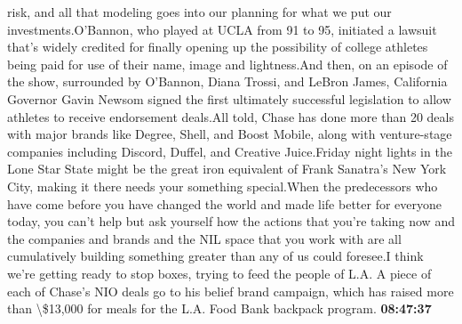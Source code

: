 \documentclass{article}%
\begin{document}
risk, and all that modeling goes into our planning for what we put our investments.O'Bannon, who played at UCLA from 91 to 95, initiated a lawsuit that's widely credited for finally opening up the possibility of college athletes being paid for use of their name, image and lightness.And then, on an episode of the show, surrounded by O'Bannon, Diana Trossi, and LeBron James, California Governor Gavin Newsom signed the first ultimately successful legislation to allow athletes to receive endorsement deals.All told, Chase has done more than 20 deals with major brands like Degree, Shell, and Boost Mobile, along with venture{-}stage companies including Discord, Duffel, and Creative Juice.Friday night lights in the Lone Star State might be the great iron equivalent of Frank Sanatra's New York City, making it there needs your something special.When the predecessors who have come before you have changed the world and made life better for everyone today, you can't help but ask yourself how the actions that you're taking now and the companies and brands and the NIL space that you work with are all cumulatively building something greater than any of us could foresee.I think we're getting ready to stop boxes, trying to feed the people of L.A. A piece of each of Chase's NIO deals go to his belief brand campaign, which has raised more than \textbackslash{}\$13,000 for meals for the L.A. Food Bank backpack program.%
\textbf{08:47:37}%
\newline%
\end{document}
